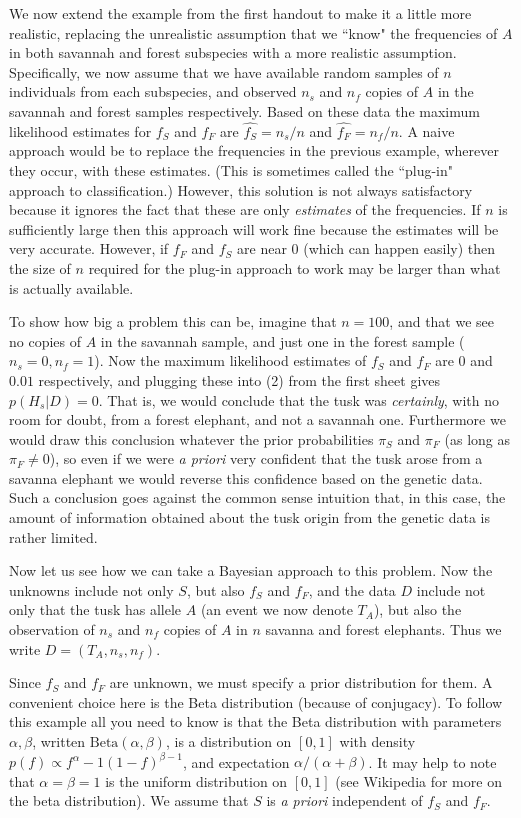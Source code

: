 \documentclass{article}[11pt]
\def\ffA{f_F}
\def\fsA{f_S}
\def\nsA{{n_s}}
\def\nfA{{n_f}}
\def\pif{\pi_F}
\def\pis{\pi_S}
\def\ta{T_A}
\def\be{\text{Beta}}
\begin{document}
We now extend the example from the first handout to make it a little more realistic, replacing the unrealistic assumption that we ``know" the frequencies of $A$ in both savannah and forest subspecies with a more realistic assumption. Specifically, we now assume that we have available random samples of $n$ individuals from each subspecies, and observed $\nsA$ and $\nfA$ copies of $A$ in the savannah and forest samples respectively. Based on these data the maximum likelihood estimates
for $\fsA$ and $\ffA$ are $\hat{\fsA} = \nsA/n$ and $\hat{\ffA} = \nfA/n$.
A naive approach would be to replace the frequencies in the previous example, wherever they occur, with these estimates. (This is sometimes called
the ``plug-in" approach to classification.) However, this solution is not always satisfactory because it ignores the fact that these are only {\it estimates} of the frequencies. If $n$ is sufficiently large then this approach will work fine because the estimates will be very accurate. However, if $\ffA$ and $\fsA$ are near 0 (which can happen easily) then the size of $n$ required for the plug-in approach to work may be larger than what is actually available. 

To show how big a problem this can be, imagine that $n=100$, and that we see no copies of $A$ in the savannah sample, and just one in the forest sample ($\nsA = 0, \nfA=1$). Now the maximum likelihood estimates of $\fsA$ and $\ffA$ are $0$ and $0.01$ respectively, and plugging these into (2) from the first sheet gives $p(H_s|D) = 0$. That is, we would conclude that the tusk was {\it certainly}, with no room for doubt, from a forest elephant, and not a savannah one. Furthermore we would draw this conclusion whatever the prior probabilities $\pis$ and $\pif$ (as long as $\pif \neq 0$), so even if we were {\it a priori} very confident that the tusk arose from a savanna elephant we would reverse this confidence based on the genetic data. Such a conclusion goes against the common sense intuition that, in this case, the amount of information obtained about the tusk origin from the genetic data is rather limited.

Now let us see how we can take a Bayesian approach to this problem. Now the unknowns include not only $S$, but also $\fsA$ and $\ffA$, and the data $D$ 
include not only that the tusk has allele $A$ (an event we now denote $\ta$), but also the observation of $\nsA$ and $\nfA$ copies of $A$ in $n$ savanna and forest elephants. Thus we write $D=(\ta,\nsA,\nfA)$.

Since $\fsA$ and $\ffA$ are unknown, we must specify a prior distribution for
them. A convenient choice here is the Beta distribution (because of conjugacy). To follow this example all you need to know is that the Beta distribution with parameters $\alpha, \beta$, written $\be(\alpha,\beta)$, is a distribution on $[0,1]$ with density 
$p(f) \propto f^\alpha-1 (1-f)^{\beta-1}$, and expectation $\alpha/(\alpha+\beta)$. It may help to note that $\alpha=\beta=1$ is the uniform distribution on $[0,1]$ (see Wikipedia for more on the beta distribution). We assume that $S$ is {\it a priori} independent of $\fsA$ and $\ffA$.
\end{document}
